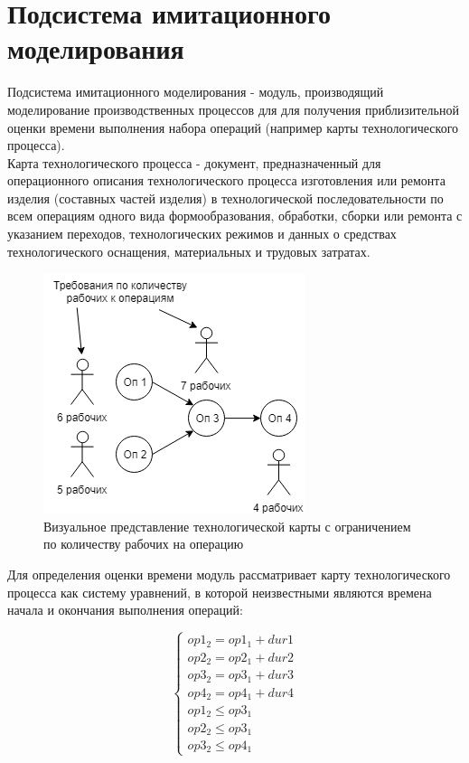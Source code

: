 \section{Подсистема имитационного моделирования}
\indent Подсистема имитационного моделирования - модуль, производящий моделирование производственных процессов для для получения приблизительной оценки времени выполнения набора операций (например карты технологического процесса).\\
\indent Карта технологического процесса - документ, предназначенный для операционного описания технологического процесса изготовления или ремонта изделия (составных частей изделия) в технологической последовательности по всем операциям одного вида формообразования, обработки, сборки или ремонта с указанием переходов, технологических режимов и данных о средствах технологического оснащения, материальных и трудовых затратах.

\begin{figure}[ht]
	\centering
	\includegraphics{pics/techMapViz.png}
	\caption{Визуальное представление технологической карты с ограничением по количеству рабочих на операцию}
	\label{fig:map}
\end{figure}

\indent Для определения оценки времени модуль рассматривает карту технологического процесса как систему уравнений, в которой неизвестными являются времена начала и окончания выполнения операций:

\begin{equation}
	\label{eq:system}
	\begin{cases}
		op1_2 = op1_1 + dur1\\
		op2_2 = op2_1 + dur2\\
		op3_2 = op3_1 + dur3\\
		op4_2 = op4_1 + dur4\\
		op1_2 \leq op3_1\\
		op2_2 \leq op3_1\\
		op3_2 \leq op4_1
	\end{cases}
\end{equation}

